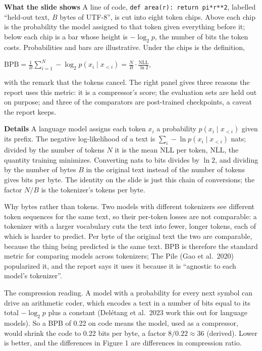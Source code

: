 \documentclass[11pt,letterpaper]{article}
\newcommand{\para}[1]{\medskip\noindent\textbf{#1}\quad}
\newenvironment{formulas}{\begin{tcolorbox}[formulabox]}{\end{tcolorbox}}
\begin{document}
\para{What the slide shows} A line of code, \texttt{def area(r): return pi*r**2}, labelled ``held-out text, $B$ bytes of UTF-8'', is cut into eight token chips. Above each chip is the probability the model assigned to that token given everything before it; below each chip is a bar whose height is $-\log_2 p$, the number of bits the token costs. Probabilities and bars are illustrative. Under the chips is the definition,
\begin{formulas}
$\displaystyle \text{BPB}=\frac{1}{B}\sum_{i=1}^{N}-\log_2 p(x_i\mid x_{<i})=\frac{N}{B}\cdot\frac{\overline{\text{NLL}}}{\ln 2}$,
\end{formulas}
with the remark that the tokens cancel. The right panel gives three reasons the report uses this metric: it is a compressor's score; the evaluation sets are held out on purpose; and three of the comparators are post-trained checkpoints, a caveat the report keeps.

\para{Details} A language model assigns each token $x_i$ a probability $p(x_i\mid x_{<i})$ given its prefix. The negative log-likelihood of a text is $\sum_i-\ln p(x_i\mid x_{<i})$ nats; divided by the number of tokens $N$ it is the mean NLL per token, $\overline{\text{NLL}}$, the quantity training minimizes. Converting nats to bits divides by $\ln 2$, and dividing by the number of bytes $B$ in the original text instead of the number of tokens gives bits per byte. The identity on the slide is just this chain of conversions; the factor $N/B$ is the tokenizer's tokens per byte.

Why bytes rather than tokens. Two models with different tokenizers see different token sequences for the same text, so their per-token losses are not comparable: a tokenizer with a larger vocabulary cuts the text into fewer, longer tokens, each of which is harder to predict. Per byte of the original text the two are comparable, because the thing being predicted is the same text. BPB is therefore the standard metric for comparing models across tokenizers; The Pile (Gao et al.\ 2020) popularized it, and the report says it uses it because it is ``agnostic to each model's tokenizer''.

The compression reading. A model with a probability for every next symbol can drive an arithmetic coder, which encodes a text in a number of bits equal to its total $-\log_2 p$ plus a constant (Del\'etang et al.\ 2023 work this out for language models). So a BPB of 0.22 on code means the model, used as a compressor, would shrink the code to 0.22 bits per byte, a factor $8/0.22\approx36$ (derived). Lower is better, and the differences in Figure 1 are differences in compression ratio.
\end{document}
